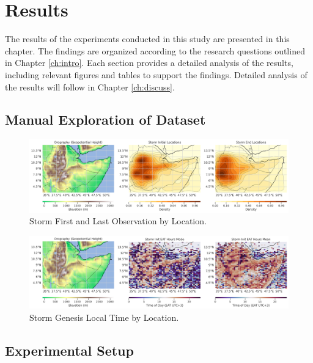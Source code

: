 \chapter{Results}
\label{ch:results}

The results of the experiments conducted in this study are presented in this chapter. The findings are organized according to the research questions outlined in Chapter \ref{ch:intro}. Each section provides a detailed analysis of the results, including relevant figures and tables to support the findings. Detailed analysis of the results will follow in Chapter \ref{ch:discuss}.

\section{Manual Exploration of Dataset}

\begin{figure}[h]
    \centering
    \includegraphics[width=\textwidth]{../figures/generated/orography_storm_init_end_kde.png}
    \caption{Storm First and Last Observation by Location.}
    \label{fig:orography_storm_init_end_kde}
\end{figure}

\begin{figure}[h]
    \centering
    \includegraphics[width=\textwidth]{../figures/generated/orography_storm_init_eat_hours_mode_mean.png}
    \caption{Storm Genesis Local Time by Location.}
    \label{fig:orography_storm_init_eat_hours_mode_mean}
\end{figure}

\section{Experimental Setup}

